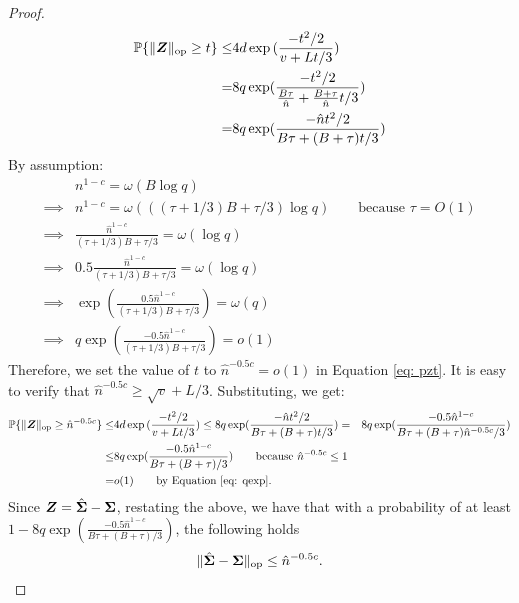 \begin{proof}
\begin{align}
    \nonumber
   \mathbb{P}\{ \lVert {\bm{Z}} \rVert_{\mathrm{op}} \geq t \}\leq & 4d \exp{ (\frac{-t^2/2}{v+Lt/3} )} \\
   \nonumber
   = & 8 q \exp( \frac{-t^2/2}{ \frac{B\tau}{\hat{n}} + \frac{B+\tau}{\hat{n}} t /3   } ) \\
   \label{eq: pzt}
   = & 8 q\exp( \frac{- \hat{n} t^2/2}{ B\tau+ (B+\tau) t /3   } ) 
\end{align}
By assumption:
\begin{align} 
\nonumber
& n^{1-c}=\omega(B\log q)\\
\nonumber
\implies &  n^{1-c}=\omega(((\tau+1/3)B+\tau/3)\log q)  \quad\quad\text{because $\tau=O(1)$} \\
\nonumber
\implies & \frac{\hat{n}^{1-c}}{(\tau+1/3)B+\tau/3} = \omega(\log q  )\\
    \nonumber
    \implies  & 0.5\frac{\hat{n}^{1-c}}{(\tau+1/3)B+\tau/3} 
 = \omega( \log q ) \\
    \nonumber
    \implies & \exp\left(\frac{0.5\hat{n}^{1-c}}{(\tau+1/3)B+\tau/3}  \right) = \omega( q ) \\
    \label{eq: qexp}
    \implies & q \exp\left(\frac{-0.5\hat{n}^{1-c}}{(\tau+1/3)B+\tau/3}  \right) = o(1)
\end{align}
Therefore, we set the value of $t$ to $\hat{n}^{-0.5c} = o(1)$ in Equation \ref{eq: pzt}. It is easy to verify that $\hat{n}^{-0.5c} \geq \sqrt{v}+L/3$. Substituting, we get: 
\begin{align}
    \nonumber
   \mathbb{P}\{ \lVert {\bm{Z}} \rVert_{\mathrm{op}} \geq \hat{n}^{-0.5c} \}\leq & 4d \exp{ (\frac{-t^2/2}{v+Lt/3} )} \leq 8q\exp( \frac{- \hat{n} t^2/2}{ B\tau+ (B+\tau) t /3   } ) =&  8q\exp( \frac{- 0.5 \hat{n}^{1-c} }{ B\tau+ (B+\tau) \hat{n}^{-0.5c} /3   } ) \\
    \nonumber
    \leq & 8q\exp( \frac{- 0.5 \hat{n}^{1-c} }{ B\tau+ (B+\tau)/3   } ) \quad\quad\text{because $\hat{n}^{-0.5c}\leq 1$} \\
    \nonumber
    = & o(1)   \quad\quad\text{by Equation \ref{eq: qexp}}.
\end{align}
Since ${\bm{Z}}= \hat{{\bm{\Sigma}}}-{\bm{\Sigma}} $, restating the above, we have that with a probability of at least $1-8q\exp( \frac{- 0.5 \hat{n}^{1-c} }{ B\tau+ (B+\tau)/3   } ) $, the following holds
\begin{align}
    \nonumber
    \lVert \hat{{\bm{\Sigma}}}-{\bm{\Sigma}} \rVert_{\mathrm{op}} \leq \hat{n}^{-0.5c}.
\end{align}
\end{proof}

